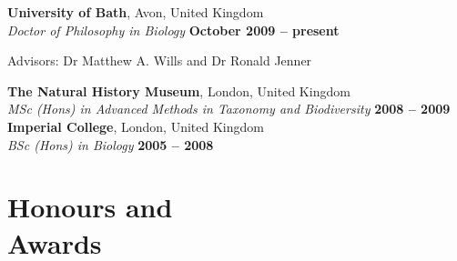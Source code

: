 \documentclass[margin,line]{resume}
\begin{document}
\begin{resume}
    \textbf{University of Bath}, Avon, United Kingdom \vspace{2mm}\\\vspace{1mm}%
    \textsl{Doctor of Philosophy in Biology} \hfill \textbf{ October 2009 -- present}\vspace{-3mm}\\\vspace{-1mm}%
    \begin{list2}
        \item Advisors:  Dr Matthew A. Wills and Dr Ronald Jenner
    \end{list2}\vspace{-3mm}
    \textbf{The Natural History Museum}, London, United Kingdom \vspace{0mm}\\\vspace{1mm}%
    \textsl{MSc (Hons) in Advanced Methods in Taxonomy and Biodiversity} \hfill \textbf{2008 -- 2009}\vspace{0mm}\\\vspace{1mm}%
    \textbf{Imperial College}, London, United Kingdom \vspace{-1mm}\\\vspace{1mm}%
    \textsl{BSc (Hons) in Biology} \hfill \textbf{2005 -- 2008}\vspace{1mm}\\

\vspace{-9 mm}
    \section{\mysidestyle Honours and\\Awards} 


\end{resume}
\end{document}
